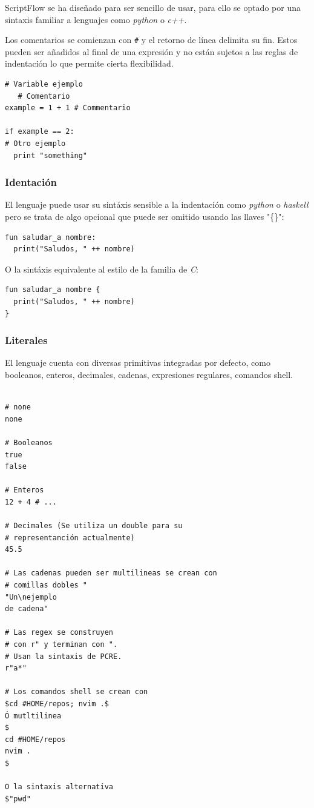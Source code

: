 \documentclass[11pt]{article}
\begin{document}
ScriptFlow se ha diseñado para ser sencillo de usar, para ello se optado por una sintaxis familiar a lenguajes como
\emph{python} o \emph{c++}.

Los comentarios se comienzan con \texttt{\#} y el retorno de línea delimita su fin. Estos pueden ser añadidos al final de una expresión y no están sujetos a las reglas de indentación
lo que permite cierta flexibilidad.

\begin{verbatim}
# Variable ejemplo
   # Comentario
example = 1 + 1 # Commentario

if example == 2:
# Otro ejemplo
  print "something"
\end{verbatim}

\subsubsection{Identación}
\label{sec:orgabd9e11}

\label{org2ab0aa3}
El lenguaje puede usar su sintáxis sensible a la indentación como \emph{python} o \emph{haskell} pero se trata de algo opcional que puede ser omitido usando las llaves "\{\}":

\begin{verbatim}
fun saludar_a nombre:
  print("Saludos, " ++ nombre)
\end{verbatim}

O la sintáxis equivalente al estilo de la familia de \emph{C}:
\begin{verbatim}
fun saludar_a nombre {
  print("Saludos, " ++ nombre)
}
\end{verbatim}

\subsubsection{Literales}
\label{sec:org89c9024}

El lenguaje cuenta con diversas primitivas integradas por defecto, como
booleanos, enteros, decimales, cadenas, expresiones regulares, comandos
shell.

\begin{verbatim}

# none
none

# Booleanos
true
false

# Enteros
12 + 4 # ...

# Decimales (Se utiliza un double para su
# representanción actualmente)
45.5

# Las cadenas pueden ser multilineas se crean con
# comillas dobles "
"Un\nejemplo
de cadena"

# Las regex se construyen
# con r" y terminan con ".
# Usan la sintaxis de PCRE.
r"a*"

# Los comandos shell se crean con
$cd #HOME/repos; nvim .$
Ó mutltilinea
$
cd #HOME/repos
nvim .
$

O la sintaxis alternativa
$"pwd"
\end{verbatim}
\end{document}
